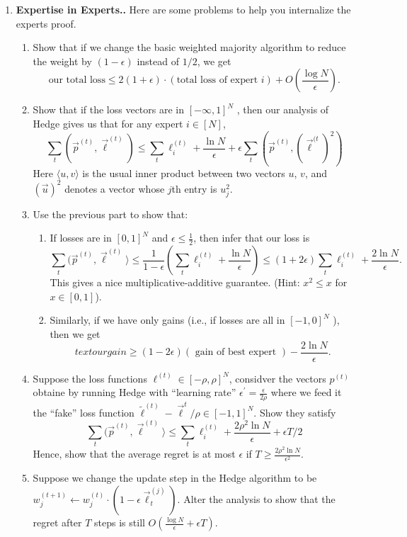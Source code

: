 \documentclass{article}
\theoremstyle{plain}
\newcommand{\w}[2]{w_{#1}^{(#2)}}
\newcommand{\loss}[2]{\vec{\ell}_{#2}^{(#1)}}
\newcommand\litem[1]{\item{\bfseries#1.\space}}
\begin{document}
\begin{enumerate}
\litem{Expertise in Experts.} Here are some problems to help you internalize the experts proof.
\begin{enumerate}
  \item  Show that if we change the basic weighted majority algorithm to reduce the weight by
    $(1 − \epsilon)$ instead of $1/2$, we get
    \[\textrm{our total loss} \leq   2(1 + \epsilon) \cdot (\textrm{total loss of expert }i) + O(\frac{\log N}{\epsilon}).\]

    \item Show that if the loss vectors are in $[-\infty, 1]^N$ , then our analysis of Hedge gives us that
for any expert $i \in [N]$,
\[\sum _ { t } ( \vec { p } ^ { ( t ) } ,\vec { \ell } ^ { ( t ) } ) \leq \sum _ { t } \ell _ { i } ^ { ( t ) } + \frac { \ln N } { \epsilon } + \epsilon \sum _ { t } ( \vec { p } ^ { ( t ) } ,( \vec { \ell } ^ { ( t } ) ^ { 2} )\]
%
Here $\langle u, v \rangle$ is the usual inner product between two vectors $u$, $v$, and $(\vec{u})^2$ denotes a vector
whose $j$th entry is $u^2_j$.

\item Use the previous part to show that:
  \begin{enumerate}
  \item If losses are in $[0, 1]^N$ and $\epsilon \leq \frac{1}{2}$, then infer that our loss is
    \[\sum _ { t } ( \vec { p } ^ { ( t ) } ,\vec { \ell } ^ { ( t ) } \rangle \leq \frac { 1} { 1- \epsilon } ( \sum _ { t } \ell _ { i } ^ { ( t ) } + \frac { \ln N } { \epsilon } ) \leq ( 1+ 2\epsilon ) \sum _ { t } \ell _ { i } ^ { ( t ) } + \frac { 2\ln N } { \epsilon }.\]
    This gives a nice multiplicative-additive guarantee. (Hint: $x^2 \leq x$ for $x \in [0,1]$).
  \item Similarly, if we have only gains (i.e., if losses are all in  $[−1, 0]^N$ ), then we get
    \[text{ our gain } \geq ( 1- 2\epsilon ) ( \text{ gain of best expert } ) - \frac { 2\ln N } { \epsilon }.\]
  \end{enumerate}
\item Suppose the loss functions $\ell^{(t)} \in [- \rho, \rho]^N$, considver the vectors $p^{(t)}$ obtaine by running Hedge with ``learning rate'' $\epsilon^\prime = \frac{\epsilon}{2\rho}$ where we feed it the ``fake'' loss function $\tilde{\ell}^{(t)} - \vec\ell^{t}/\rho \in [-1,1]^N$. Show they satisfy
\[\sum _ { t } ( \vec { p } ^ { ( t ) } ,\vec { \ell } ^ { ( t ) } \rangle \leq \sum _ { t } \ell _ { i } ^ { ( t ) } + \frac { 2\rho ^ { 2} \ln N } { \epsilon } + \epsilon T / 2\]
    Hence, show that the average regret is at most $\epsilon$ if $T \geq \frac{2 \rho^2 \ln N}{\epsilon^2}$.
  \item Suppose we change the update step in the Hedge algorithm to be $\w{j}{t+1} \gets \w{j}{t} \cdot (1 - \epsilon \loss{j}{t})$.
    Alter the analysis to show that the regret after $T$ steps is still $O\left(\frac{\log N}{\epsilon} + \epsilon T\right)$.
  
\end{enumerate}
\end{enumerate}
\end{document}

